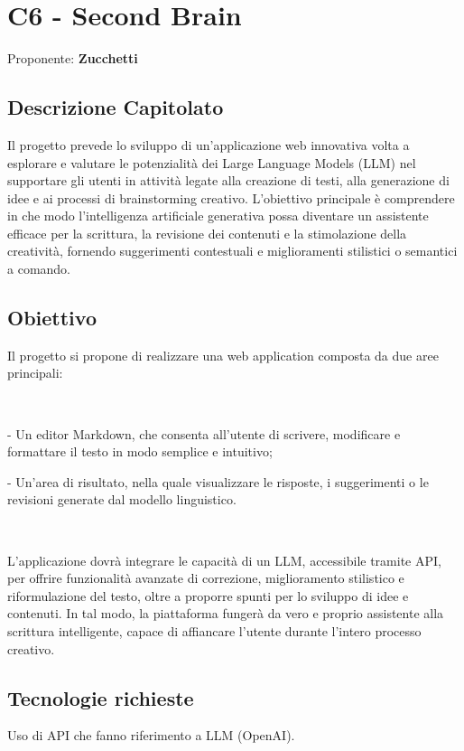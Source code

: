 \documentclass[a4paper,12pt]{article}
\begin{document}
\section{C6 - Second Brain}{
    Proponente: \textbf{Zucchetti}
    \subsection*{Descrizione Capitolato}{
        Il progetto prevede lo sviluppo di un'applicazione web innovativa volta a esplorare e valutare le potenzialità dei Large Language Models (LLM) nel supportare gli utenti in attività legate alla creazione di testi, alla generazione di idee e ai processi di brainstorming creativo.
        L'obiettivo principale è comprendere in che modo l'intelligenza artificiale generativa possa diventare un assistente efficace per la scrittura, la revisione dei contenuti e la stimolazione della creatività, fornendo suggerimenti contestuali e miglioramenti stilistici o semantici a comando.
    }

    \subsection*{Obiettivo}{
        Il progetto si propone di realizzare una web application composta da due aree principali:

        \

        - Un editor Markdown, che consenta all'utente di scrivere, modificare e formattare il testo in modo semplice e intuitivo;
        
        - Un'area di risultato, nella quale visualizzare le risposte, i suggerimenti o le revisioni generate dal modello linguistico.

        \
        
        \noindent L'applicazione dovrà integrare le capacità di un LLM, accessibile tramite API, per offrire funzionalità avanzate di correzione, miglioramento stilistico e riformulazione del testo, oltre a proporre spunti per lo sviluppo di idee e contenuti. In tal modo, la piattaforma fungerà da vero e proprio assistente alla scrittura intelligente, capace di affiancare l'utente durante l'intero processo creativo.
    }

    \subsection*{Tecnologie richieste}{
        Uso di API che fanno riferimento a LLM (OpenAI).
    }

}
\end{document}
